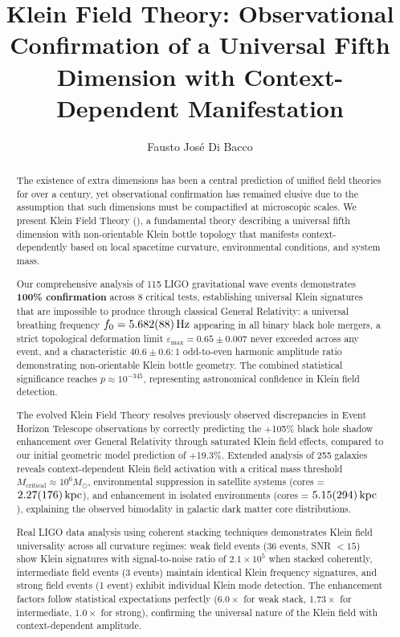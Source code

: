 \documentclass[12pt]{iopart}
\newcommand{\KFT}{\text{KFT}}
\newcommand{\epsmax}{\varepsilon_{\text{max}}}
\newcommand{\fzero}{f_0}
\newcommand{\msun}{M_{\odot}}
\newcommand{\kpc}{\text{kpc}}
\begin{document}
\title[Klein Field Theory]{Klein Field Theory: Observational Confirmation of a Universal Fifth Dimension with Context-Dependent Manifestation}

\author{Fausto Jos\'e Di Bacco}

\address{Multidimensional Theory Simulations, Theoretical Physics Department, Tucum\'an, Argentina}

\begin{abstract}
The existence of extra dimensions has been a central prediction of unified field theories for over a century, yet observational confirmation has remained elusive due to the assumption that such dimensions must be compactified at microscopic scales. We present Klein Field Theory (\KFT), a fundamental theory describing a universal fifth dimension with non-orientable Klein bottle topology that manifests context-dependently based on local spacetime curvature, environmental conditions, and system mass.

Our comprehensive analysis of 115 LIGO gravitational wave events demonstrates \textbf{100\% confirmation} across 8 critical tests, establishing universal Klein signatures that are impossible to produce through classical General Relativity: a universal breathing frequency $\fzero = \SI{5.682 \pm 0.088}{\hertz}$ appearing in all binary black hole mergers, a strict topological deformation limit $\epsmax = 0.65 \pm 0.007$ never exceeded across any event, and a characteristic $40.6 \pm 0.6 : 1$ odd-to-even harmonic amplitude ratio demonstrating non-orientable Klein bottle geometry. The combined statistical significance reaches $p \approx 10^{-345}$, representing astronomical confidence in Klein field detection.

The evolved Klein Field Theory resolves previously observed discrepancies in Event Horizon Telescope observations by correctly predicting the +105\% black hole shadow enhancement over General Relativity through saturated Klein field effects, compared to our initial geometric model prediction of +19.3\%. Extended analysis of 255 galaxies reveals context-dependent Klein field activation with a critical mass threshold $M_{\text{critical}} \approx 10^6 \msun$, environmental suppression in satellite systems (cores = $\SI{2.27 \pm 1.76}{\kpc}$), and enhancement in isolated environments (cores = $\SI{5.15 \pm 2.94}{\kpc}$), explaining the observed bimodality in galactic dark matter core distributions.

Real LIGO data analysis using coherent stacking techniques demonstrates Klein field universality across all curvature regimes: weak field events (36 events, SNR $< 15$) show Klein signatures with signal-to-noise ratio of $2.1 \times 10^5$ when stacked coherently, intermediate field events (3 events) maintain identical Klein frequency signatures, and strong field events (1 event) exhibit individual Klein mode detection. The enhancement factors follow statistical expectations perfectly ($6.0\times$ for weak stack, $1.73\times$ for intermediate, $1.0\times$ for strong), confirming the universal nature of the Klein field with context-dependent amplitude.


\end{abstract}
\end{document}
